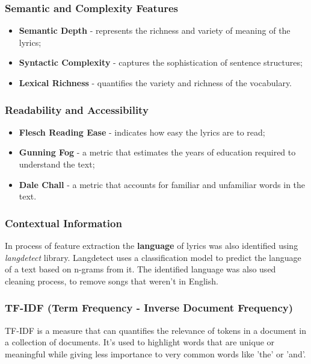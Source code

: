 \subsubsection*{Semantic and Complexity Features}
\begin{itemize}
  \item \textbf{Semantic Depth} - represents the richness and variety of
    meaning of the lyrics;
  \item \textbf{Syntactic Complexity} - captures the sophistication of
    sentence structures;
  \item \textbf{Lexical Richness} - quantifies the variety and richness of the
    vocabulary.
\end{itemize}



\subsubsection*{Readability and Accessibility}
\begin{itemize}
  \item \textbf{Flesch Reading Ease} - indicates how easy the lyrics are to
    read;
  \item \textbf{Gunning Fog} - a metric that estimates the  years of education
    required to understand the text;
  \item \textbf{Dale Chall} - a metric that accounts for familiar and
    unfamiliar words in the text.
\end{itemize}


\subsubsection*{Contextual Information}
  In process of feature extraction the \textbf{language} of lyrics was also
  identified using \textit{langdetect} library. Langdetect uses a
  classification model to predict the language of a text based on n-grams from
  it. The identified language was also used cleaning process, to remove songs
  that weren't in English.

\subsubsection*{TF-IDF (Term Frequency - Inverse Document Frequency)}

TF-IDF is a measure that can quantifies the relevance of tokens in a
document in a collection of documents. It's used to highlight words that are unique or
meaningful while giving less importance to very common words like 'the' or
'and'.\cite{tfidf}

